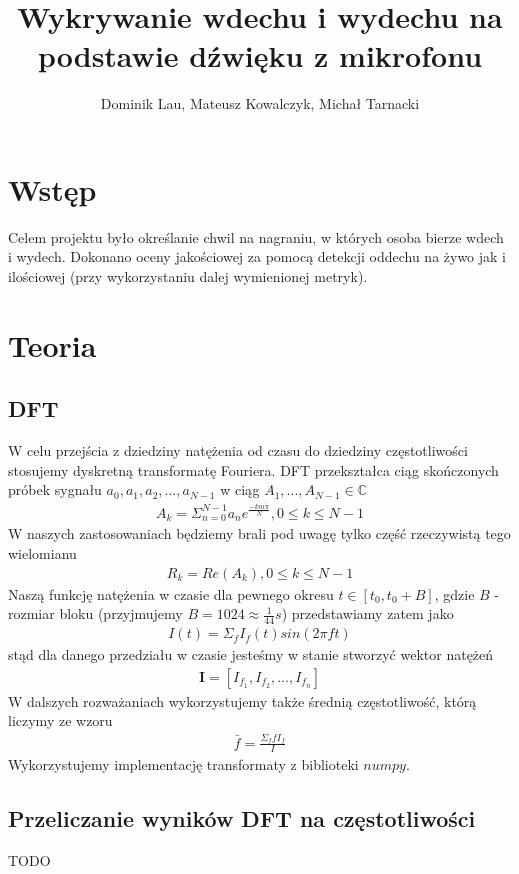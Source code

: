 \documentclass[polish]{article}
\title{Wykrywanie wdechu i wydechu na podstawie dźwięku z mikrofonu}
\author{Dominik Lau, Mateusz Kowalczyk, Michał Tarnacki}
\begin{document}
\maketitle

\section{Wstęp}
Celem projektu było określanie chwil na nagraniu, w których osoba bierze wdech i wydech. 
Dokonano oceny jakościowej za pomocą detekcji oddechu na żywo jak i ilościowej (przy wykorzystaniu
dalej wymienionej metryk).

\section{Teoria}
\subsection{DFT}
W celu przejścia z dziedziny natężenia od czasu do dziedziny częstotliwości stosujemy dyskretną transformatę
Fouriera.  DFT przekształca ciąg skończonych próbek sygnału $a_0, a_1, a_2, ..., a_{N-1}$ w ciąg 
$A_1, ..., A_{N-1} \in \mathbb{C}$
\begin{gather*}
	A_k = \Sigma_{n=0}^{N-1} a_ne^{\frac{-kni\pi}{N}}, 0 \le k \le N-1
\end{gather*}
W naszych zastosowaniach będziemy brali pod uwagę tylko część rzeczywistą tego wielomianu
\begin{gather*}
	R_k = Re(A_k), 0 \le k \le N-1
\end{gather*}
Naszą funkcję natężenia w czasie dla pewnego okresu $t \in [t_0, t_0 + B]$, gdzie $B$ - rozmiar bloku (przyjmujemy $B=1024\approx \frac{1}{44} s$) przedstawiamy zatem jako 
\begin{gather*}
	I(t) = \Sigma_{f} I_{f}(t)sin(2 \pi f t)
\end{gather*}
stąd dla danego przedziału w czasie jesteśmy w stanie stworzyć wektor natężeń
\begin{gather*}
	\boldsymbol{I} = [I_{f_1}, I_{f_2}, ..., I_{f_n}]
\end{gather*}
W dalszych rozważaniach wykorzystujemy także średnią częstotliwość, którą liczymy ze wzoru
\begin{gather*}
	\bar{f} = \frac{\Sigma_ffI_f}{I}
\end{gather*}
Wykorzystujemy implementację transformaty z biblioteki $numpy$.
\subsection{Przeliczanie wyników DFT na częstotliwości}
TODO
\end{document}
